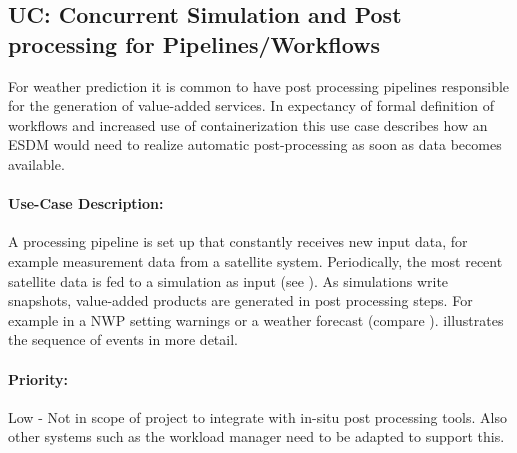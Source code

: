 %
%
%
%
%
%



\subsection{UC: Concurrent Simulation and Post processing for Pipelines/Workflows}
\label{uc: pipeline}

For weather prediction it is common to have post processing pipelines responsible for the generation of value-added services.
In expectancy of formal definition of workflows and increased use of containerization this use case describes how an ESDM would need to realize automatic post-processing as soon as data becomes available.


\paragraph{Use-Case Description:}
A processing pipeline is set up that constantly receives new input data, for example measurement data from a satellite system.
Periodically, the most recent satellite data is fed to a simulation as input (see ).
As simulations write snapshots, value-added products are generated in post processing steps.
For example in a NWP setting warnings or a weather forecast (compare ).
 illustrates the sequence of events in more detail.




\paragraph{Priority:}
Low - Not in scope of project to integrate with in-situ post processing tools.
Also other systems such as the workload manager need to be adapted to support this.


